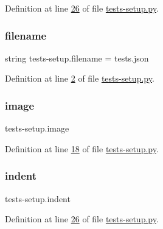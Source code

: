Definition at line \mbox{\hyperlink{tests-setup_8py_source_l00026}{26}} of file \mbox{\hyperlink{tests-setup_8py_source}{tests-\/setup.\+py}}.

\mbox{\label{namespacetests-setup_a1c1b6d4c14026d664106586c65e10a94}} 
\subsubsection{\texorpdfstring{filename}{filename}}
{\footnotesize\ttfamily string tests-\/setup.\+filename = \textquotesingle{}tests.\+json\textquotesingle{}}



Definition at line \mbox{\hyperlink{tests-setup_8py_source_l00002}{2}} of file \mbox{\hyperlink{tests-setup_8py_source}{tests-\/setup.\+py}}.

\mbox{\label{namespacetests-setup_ad55b685280f549e15688a94cbb89f512}} 
\subsubsection{\texorpdfstring{image}{image}}
{\footnotesize\ttfamily tests-\/setup.\+image}



Definition at line \mbox{\hyperlink{tests-setup_8py_source_l00018}{18}} of file \mbox{\hyperlink{tests-setup_8py_source}{tests-\/setup.\+py}}.

\mbox{\label{namespacetests-setup_aee04695e456c1d05ed5119e87842fc86}} 
\subsubsection{\texorpdfstring{indent}{indent}}
{\footnotesize\ttfamily tests-\/setup.\+indent}



Definition at line \mbox{\hyperlink{tests-setup_8py_source_l00026}{26}} of file \mbox{\hyperlink{tests-setup_8py_source}{tests-\/setup.\+py}}.

\mbox{\label{namespacetests-setup_a1e5de3b19e0107100d5df9b7e2122764}} 
